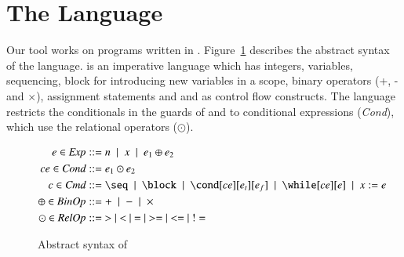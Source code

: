 \section{The Language \lang}

Our tool works on programs written in \lang.
Figure~\ref{fig:syntax} describes the abstract syntax of the language.
\lang is an imperative language which has integers, variables, sequencing,  block for introducing new variables in a scope, binary operators (+, - and \ensuremath{\times}), assignment statements and  and  as control flow constructs. 
The language restricts the conditionals in the guards of  and  to conditional expressions (\textit{Cond}), which use the relational operators ($\odot$).

\begin{figure}
\centering
  \begin{align*}
    e \in \Exp &::= n \alt x \alt e_1 \bop e_2
    \\
    ce \in \textit{Cond} &::= e_1 \odot e_2
    \\
    c \in \textit{Cmd} &::= \seq \alt \block \alt \cond[ce][e_t][e_f] \alt \while[ce][e] \alt x := e 
    \\
    \bop \in \BinOp &::= + \alt - \alt \times
    \\
    \odot \in \textit{RelOp} &::=\ > \alt < \alt = \alt >= \alt <= \alt !=
  \end{align*}
\caption{Abstract syntax of \lang}
\label{fig:syntax}
\end{figure}
